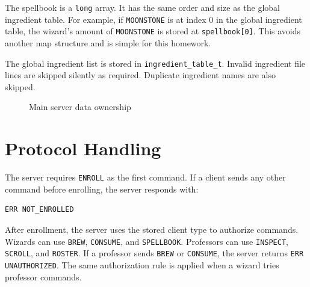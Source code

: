 \documentclass[11pt,a4paper]{article}
\begin{document}
The spellbook is a \texttt{long} array. It has the same order and size as the global ingredient table.
For example, if \texttt{MOONSTONE} is at index 0 in the global ingredient table, the wizard's amount of
\texttt{MOONSTONE} is stored at \texttt{spellbook[0]}. This avoids another map structure and is simple
for this homework.

The global ingredient list is stored in \texttt{ingredient\_table\_t}. Invalid ingredient file lines are
skipped silently as required. Duplicate ingredient names are also skipped.

\begin{figure}[H]
\centering
{}
\caption{Main server data ownership}
\end{figure}

\section{Protocol Handling}

The server requires \texttt{ENROLL} as the first command. If a client sends any other command before
enrolling, the server responds with:

\begin{lstlisting}
ERR NOT_ENROLLED
\end{lstlisting}

After enrollment, the server uses the stored client type to authorize commands. Wizards can use
\texttt{BREW}, \texttt{CONSUME}, and \texttt{SPELLBOOK}. Professors can use \texttt{INSPECT},
\texttt{SCROLL}, and \texttt{ROSTER}. If a professor sends \texttt{BREW} or \texttt{CONSUME}, the
server returns \texttt{ERR UNAUTHORIZED}. The same authorization rule is applied when a wizard tries
professor commands.
\end{document}
